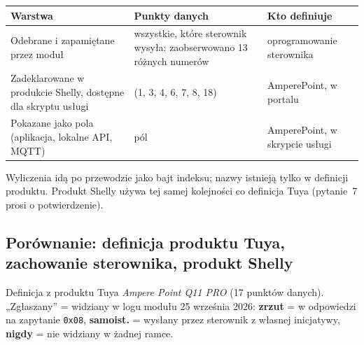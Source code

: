 \documentclass[11pt,a4paper]{article}
\newcommand{\hx}[1]{\texttt{#1}}
\begin{document}
\begin{longtable}{>{\raggedright\arraybackslash}p{6.2cm}>{\raggedright\arraybackslash}p{3.0cm}>{\raggedright\arraybackslash}p{6.9cm}}
\toprule
\rowcolor{aphead}\textbf{Warstwa} & \textbf{Punkty danych} & \textbf{Kto definiuje} \\
\midrule\endhead
\bottomrule\endfoot
Odebrane i zapamiętane przez moduł & wszystkie, które sterownik wysyła: zaobserwowano 13 różnych numerów & oprogramowanie sterownika \\
Zadeklarowane w produkcie Shelly, dostępne dla skryptu usługi & 7 (1, 3, 4, 6, 7, 8, 18) & AmperePoint, w portalu \\
Pokazane jako pola (aplikacja, lokalne API, MQTT) & 6 pól & AmperePoint, w skrypcie usługi \\
\end{longtable}

Wyliczenia idą po przewodzie jako bajt indeksu; nazwy istnieją tylko w definicji produktu. Produkt Shelly używa tej samej kolejności co definicja Tuya (pytanie~7 prosi o potwierdzenie).

\subsection{Porównanie: definicja produktu Tuya, zachowanie sterownika, produkt Shelly}

Definicja z produktu Tuya \emph{Ampere Point Q11 PRO} (17 punktów danych). „Zgłaszany” = widziany w logu modułu 25 września 2026: \textbf{zrzut} = w odpowiedzi na zapytanie \hx{0x08}, \textbf{samoist.} = wysłany przez sterownik z własnej inicjatywy, \textbf{nigdy} = nie widziany w żadnej ramce.
\end{document}
